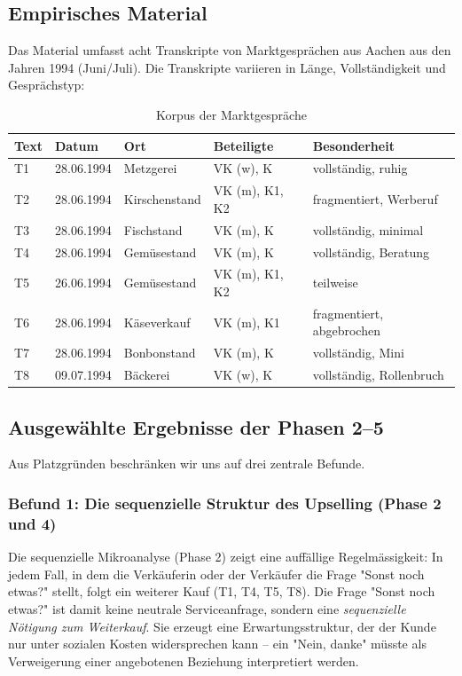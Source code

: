 \documentclass[12pt,a4paper]{article}
\begin{document}
\subsection{Empirisches Material}

Das Material umfasst acht Transkripte von Marktgesprächen aus Aachen aus den Jahren 1994 (Juni/Juli). Die Transkripte variieren in Länge, Vollständigkeit und Gesprächstyp:

\begin{table}[H]
\centering
\caption{Korpus der Marktgespräche}
\begin{tabular}{@{}lllll@{}}
\toprule
Text & Datum & Ort & Beteiligte & Besonderheit \\
\midrule
T1 & 28.06.1994 & Metzgerei & VK (w), K & vollständig, ruhig \\
T2 & 28.06.1994 & Kirschenstand & VK (m), K1, K2 & fragmentiert, Werberuf \\
T3 & 28.06.1994 & Fischstand & VK (m), K & vollständig, minimal \\
T4 & 28.06.1994 & Gemüsestand & VK (m), K & vollständig, Beratung \\
T5 & 26.06.1994 & Gemüsestand & VK (m), K1, K2 & teilweise \\
T6 & 28.06.1994 & Käseverkauf & VK (m), K1 & fragmentiert, abgebrochen \\
T7 & 28.06.1994 & Bonbonstand & VK (m), K & vollständig, Mini \\
T8 & 09.07.1994 & Bäckerei & VK (w), K & vollständig, Rollenbruch \\
\bottomrule
\end{tabular}
\end{table}

\subsection{Ausgewählte Ergebnisse der Phasen 2–5}

Aus Platzgründen beschränken wir uns auf drei zentrale Befunde.

\subsubsection{Befund 1: Die sequenzielle Struktur des Upselling (Phase 2 und 4)}

Die sequenzielle Mikroanalyse (Phase 2) zeigt eine auffällige Regelmässigkeit: In jedem Fall, in dem die Verkäuferin oder der Verkäufer die Frage "Sonst noch etwas?" stellt, folgt ein weiterer Kauf (T1, T4, T5, T8). Die Frage "Sonst noch etwas?" ist damit keine neutrale Serviceanfrage, sondern eine \textit{sequenzielle Nötigung zum Weiterkauf}. Sie erzeugt eine Erwartungsstruktur, der der Kunde nur unter sozialen Kosten widersprechen kann – ein "Nein, danke" müsste als Verweigerung einer angebotenen Beziehung interpretiert werden.
\end{document}
